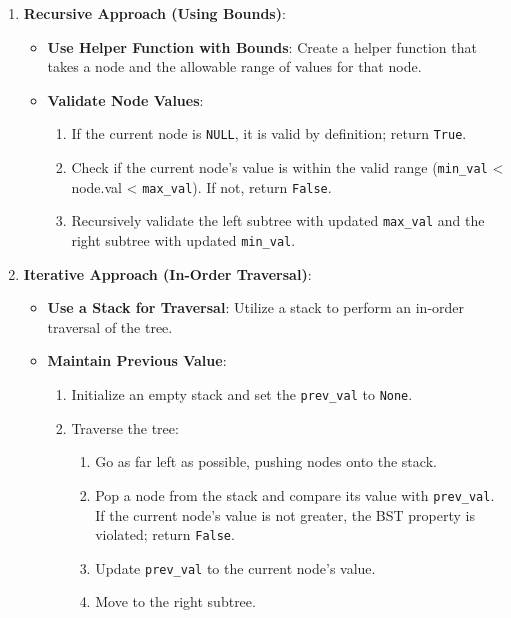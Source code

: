 \begin{enumerate}
    \item \textbf{Recursive Approach (Using Bounds)}:
    \begin{itemize}
        \item \textbf{Use Helper Function with Bounds}: Create a helper function that takes a node and the allowable range of values for that node.
        \item \textbf{Validate Node Values}:
        \begin{enumerate}
            \item If the current node is \texttt{NULL}, it is valid by definition; return \texttt{True}.
            \item Check if the current node's value is within the valid range (\texttt{min\_val} < node.val < \texttt{max\_val}). If not, return \texttt{False}.
            \item Recursively validate the left subtree with updated \texttt{max\_val} and the right subtree with updated \texttt{min\_val}.
        \end{enumerate}
    \end{itemize}
    
    \item \textbf{Iterative Approach (In-Order Traversal)}:
    \begin{itemize}
        \item \textbf{Use a Stack for Traversal}: Utilize a stack to perform an in-order traversal of the tree.
        \item \textbf{Maintain Previous Value}:
        \begin{enumerate}
            \item Initialize an empty stack and set the \texttt{prev\_val} to \texttt{None}.
            \item Traverse the tree:
            \begin{enumerate}
                \item Go as far left as possible, pushing nodes onto the stack.
                \item Pop a node from the stack and compare its value with \texttt{prev\_val}. If the current node's value is not greater, the BST property is violated; return \texttt{False}.
                \item Update \texttt{prev\_val} to the current node's value.
                \item Move to the right subtree.
            \end{enumerate}
        \end{enumerate}
    \end{itemize}
\end{enumerate}


